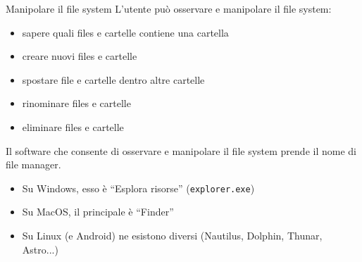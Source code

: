 \documentclass[presentation]{beamer}
\begin{document}
\begin{frame}[fragile]{Manipolare il file system}
  L'utente può osservare e manipolare il file system:
  \begin{itemize}
    \item sapere quali files e cartelle contiene una cartella
    \item creare nuovi files e cartelle
    \item spostare file e cartelle dentro altre cartelle
    \item rinominare files e cartelle
    \item eliminare files e cartelle
  \end{itemize}
  Il software che consente di osservare e manipolare il file system prende il nome di \alert{file manager}.
  \begin{itemize}
    \item Su Windows, esso è ``Esplora risorse'' (\texttt{explorer.exe})
    \item Su MacOS, il principale è ``Finder''
    \item Su Linux (e Android) ne esistono diversi (Nautilus, Dolphin, Thunar, Astro...)
  \end{itemize}
\end{frame}
\end{document}
